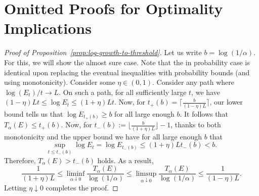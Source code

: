 \documentclass{article}
\theoremstyle{definition}
\begin{document}
\section{Omitted Proofs for Optimality Implications}

\begin{proof}[Proof of Proposition~\ref{prop:log-growth-to-threshold}]
Let us write $b=\log(1/\alpha)$. For this, we will show the almost sure case. Note that the in probability case is identical upon replacing the eventual inequalities with probability bounds (and using monotonicity). Consider some $\eta\in(0,1)$. Consider any path where $\log(E_t)/t\to L$. On such a path, for all sufficiently large $t$, we have $(1-\eta)Lt\le \log E_t\le (1+\eta)Lt$. Now, for $t_{+}(b)=\lceil \frac{b}{(1-\eta)L}\rceil$, our lower bound tells us that $\log E_{t_{+}(b)}\ge b$ for all large enough $b$. It follows that $T_{\alpha}(E)\le t_{+}(b)$. Now, for $t_{-}(b):=\lfloor\frac{b}{(1+\eta)L}\rfloor-1$, thanks to both monotonicity and the upper bound we have for all large enough $b$ that
\[
\sup_{t\le t_{-}(b)}\log E_t=\log E_{t_{-}(b)}\le (1+\eta)Lt_{-}(b)<b.
\]
Therefore, $T_{\alpha}(E)>t_{-}(b)$ holds. As a result,
\[
\frac{1}{(1+\eta)L}\le\liminf_{\alpha\downarrow0}\frac{T_\alpha(E)}{\log(1/\alpha)}\le\limsup_{\alpha\downarrow0}\frac{T_\alpha(E)}{\log(1/\alpha)}\le\frac{1}{(1-\eta)L}.
\]
Letting $\eta\downarrow 0$ completes the proof.
\end{proof}
\end{document}
